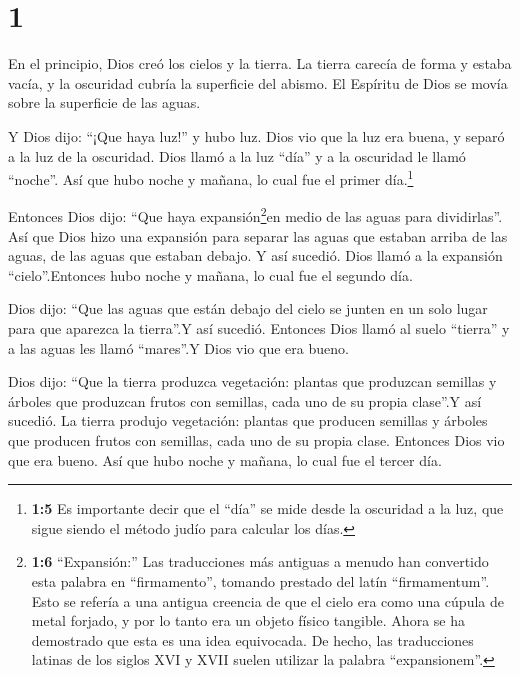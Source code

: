 \hypertarget{section}{%
\section{1}\label{section}}

 En el principio, Dios creó los cielos y la tierra.
 La tierra carecía de forma y estaba vacía, y la oscuridad
cubría la superficie del abismo. El Espíritu de Dios se movía sobre la
superficie de las aguas.

 Y Dios dijo: ``¡Que haya luz!'' y hubo luz. 
Dios vio que la luz era buena, y separó a la luz de la oscuridad.
 Dios llamó a la luz ``día'' y a la oscuridad le llamó
``noche''. Así que hubo noche y mañana, lo cual fue el primer
día.\footnote{\textbf{1:5} Es importante decir que el ``día'' se mide
  desde la oscuridad a la luz, que sigue siendo el método judío para
  calcular los días.}

 Entonces Dios dijo: ``Que haya expansión\footnote{\textbf{1:6}
  ``Expansión:'' Las traducciones más antiguas a menudo han convertido
  esta palabra en ``firmamento'', tomando prestado del latín
  ``firmamentum''. Esto se refería a una antigua creencia de que el
  cielo era como una cúpula de metal forjado, y por lo tanto era un
  objeto físico tangible. Ahora se ha demostrado que esta es una idea
  equivocada. De hecho, las traducciones latinas de los siglos XVI y
  XVII suelen utilizar la palabra ``expansionem''.}en medio de las aguas
para dividirlas''.  Así que Dios hizo una expansión para
separar las aguas que estaban arriba de las aguas, de las aguas que
estaban debajo. Y así sucedió.  Dios llamó a la expansión
``cielo''.Entonces hubo noche y mañana, lo cual fue el segundo día.

 Dios dijo: ``Que las aguas que están debajo del cielo se
junten en un solo lugar para que aparezca la tierra''.Y así sucedió.
 Entonces Dios llamó al suelo ``tierra'' y a las aguas les
llamó ``mares''.Y Dios vio que era bueno.

 Dios dijo: ``Que la tierra produzca vegetación: plantas
que produzcan semillas y árboles que produzcan frutos con semillas, cada
uno de su propia clase''.Y así sucedió.  La tierra produjo
vegetación: plantas que producen semillas y árboles que producen frutos
con semillas, cada uno de su propia clase. Entonces Dios vio que era
bueno.  Así que hubo noche y mañana, lo cual fue el tercer
día.

